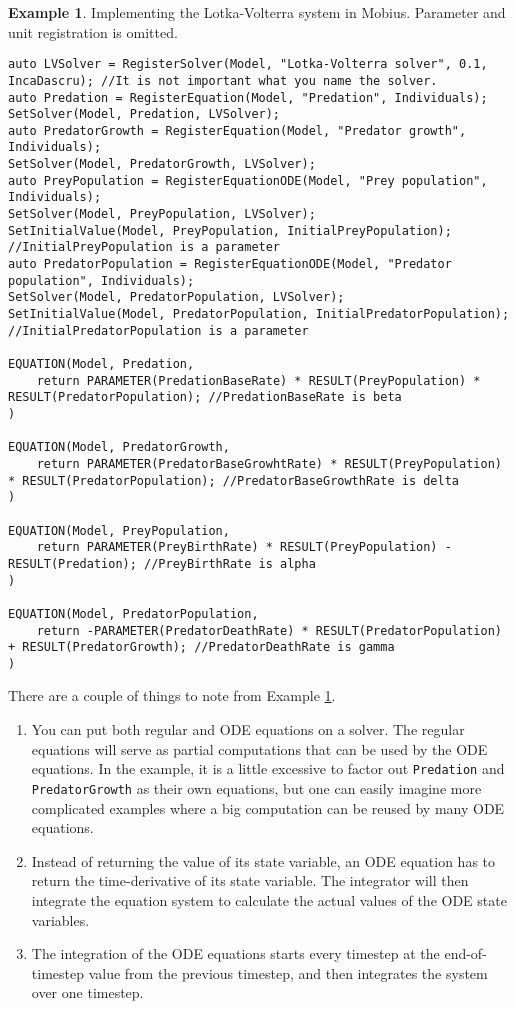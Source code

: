 \documentclass[11pt]{article}
\theoremstyle{definition}
\newtheorem{myexample}{Example}
\newenvironment{example}%
  {\begin{lrbox}{\examplebox}%
   \begin{minipage}{\dimexpr\linewidth-2\fboxsep}
   \begin{myexample}}%
  {\end{myexample}%
   \end{minipage}%
   \end{lrbox}%
   \begin{trivlist}
     \item[]\colorbox{silver}{\usebox\examplebox}
   \end{trivlist}}
\begin{document}
\begin{example}\label{ex:lotkavolterra}
Implementing the Lotka-Volterra system in Mobius. Parameter and unit registration is omitted.
\begin{lstlisting}[style=mycpp]
auto LVSolver = RegisterSolver(Model, "Lotka-Volterra solver", 0.1, IncaDascru); //It is not important what you name the solver.
auto Predation = RegisterEquation(Model, "Predation", Individuals);
SetSolver(Model, Predation, LVSolver);
auto PredatorGrowth = RegisterEquation(Model, "Predator growth", Individuals);
SetSolver(Model, PredatorGrowth, LVSolver);
auto PreyPopulation = RegisterEquationODE(Model, "Prey population", Individuals);
SetSolver(Model, PreyPopulation, LVSolver);
SetInitialValue(Model, PreyPopulation, InitialPreyPopulation); //InitialPreyPopulation is a parameter
auto PredatorPopulation = RegisterEquationODE(Model, "Predator population", Individuals);
SetSolver(Model, PredatorPopulation, LVSolver);
SetInitialValue(Model, PredatorPopulation, InitialPredatorPopulation); //InitialPredatorPopulation is a parameter

EQUATION(Model, Predation,
	return PARAMETER(PredationBaseRate) * RESULT(PreyPopulation) * RESULT(PredatorPopulation); //PredationBaseRate is beta
)

EQUATION(Model, PredatorGrowth,
	return PARAMETER(PredatorBaseGrowhtRate) * RESULT(PreyPopulation) * RESULT(PredatorPopulation); //PredatorBaseGrowthRate is delta
)

EQUATION(Model, PreyPopulation,
	return PARAMETER(PreyBirthRate) * RESULT(PreyPopulation) - RESULT(Predation); //PreyBirthRate is alpha
)

EQUATION(Model, PredatorPopulation,
	return -PARAMETER(PredatorDeathRate) * RESULT(PredatorPopulation) + RESULT(PredatorGrowth); //PredatorDeathRate is gamma
)
\end{lstlisting}
\end{example}

There are a couple of things to note from Example \ref{ex:lotkavolterra}.
\begin{enumerate}[i]
\item You can put both regular and ODE equations on a solver. The regular equations will serve as partial computations that can be used by the ODE equations. In the example, it is a little excessive to factor out {\tt Predation} and {\tt PredatorGrowth} as their own equations, but one can easily imagine more complicated examples where a big computation can be reused by many ODE equations.
\item Instead of returning the value of its state variable, an ODE equation has to return the time-derivative of its state variable. The integrator will then integrate the equation system to calculate the actual values of the ODE state variables.
\item The integration of the ODE equations starts every timestep at the end-of-timestep value from the previous timestep, and then integrates the system over one timestep.
\end{enumerate}
\end{document}

